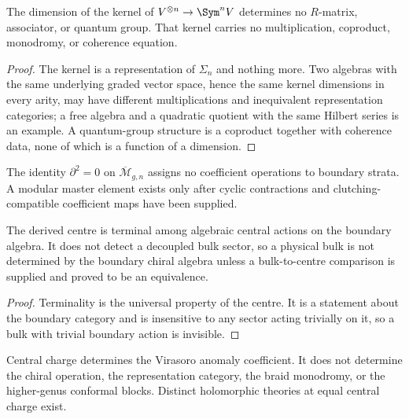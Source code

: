 \begin{theorem}
\label{nogo:dimension-loss-spine}
The dimension of the kernel of $V^{\otimes n}\to\Sym^nV$ determines no
$R$-matrix, associator, or quantum group. That kernel carries no
multiplication, coproduct, monodromy, or coherence equation.
\end{theorem}
\begin{proof}
The kernel is a representation of $\Sigma_n$ and nothing more. Two algebras
with the same underlying graded vector space, hence the same kernel dimensions
in every arity, may have different multiplications and inequivalent
representation categories; a free algebra and a quadratic quotient with the
same Hilbert series is an example. A quantum-group structure is a coproduct
together with coherence data, none of which is a function of a dimension.
\end{proof}

\begin{theorem}
The identity $\partial^2=0$ on $\overline{\mathcal M}_{g,n}$ assigns no
coefficient operations to boundary strata. A modular master element exists only
after cyclic contractions and clutching-compatible coefficient maps have been
supplied.
\end{theorem}

\begin{theorem}
The derived centre is terminal among algebraic central actions on the boundary
algebra. It does not detect a decoupled bulk sector, so a physical bulk is not
determined by the boundary chiral algebra unless a bulk-to-centre comparison is
supplied and proved to be an equivalence.
\end{theorem}
\begin{proof}
Terminality is the universal property of the centre. It is a statement about
the boundary category and is insensitive to any sector acting trivially on it,
so a bulk with trivial boundary action is invisible.
\end{proof}

\begin{theorem}
Central charge determines the Virasoro anomaly coefficient. It does not
determine the chiral operation, the representation category, the braid
monodromy, or the higher-genus conformal blocks. Distinct holomorphic theories
at equal central charge exist.
\end{theorem}

